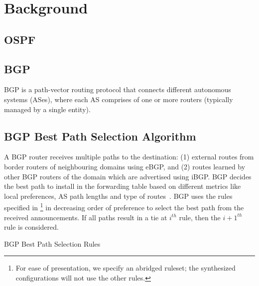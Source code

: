 \section{Background}
\subsection{OSPF}

\subsection{BGP}
BGP is a path-vector routing protocol that connects 
different autonomous systems (ASes), where each AS
comprises of one or more routers (typically managed
by a single entity). 
\\

\subsection{BGP Best Path Selection Algorithm}
A BGP router receives multiple paths to the destination: (1)
external routes from border routers of neighbouring domains using
eBGP, and (2) routes learned by other BGP routers 
of the domain which are advertised using iBGP. 
BGP decides the best path to install in the 
forwarding table based on different metrics like local preferences,
AS path lengths and type of routes~\cite{bgp}. BGP uses the
rules specified in \footnote{
For ease of presentation, we specify an abridged ruleset; 
the synthesized configurations will not use the other rules. 
} 
in decreasing order of preference to select the best path
from the received announcements. If all paths result in a tie
at $i^{th}$ rule, then the $i+1^{th}$ rule is considered.
\begin{algorithm}
	\begin{footnotesize}
		\caption{BGP Best Path Selection Rules}
		\label{alg:bgppathrules}
		\begin{algorithmic}[1]
		\end{algorithmic}
	\end{footnotesize}
\end{algorithm}


